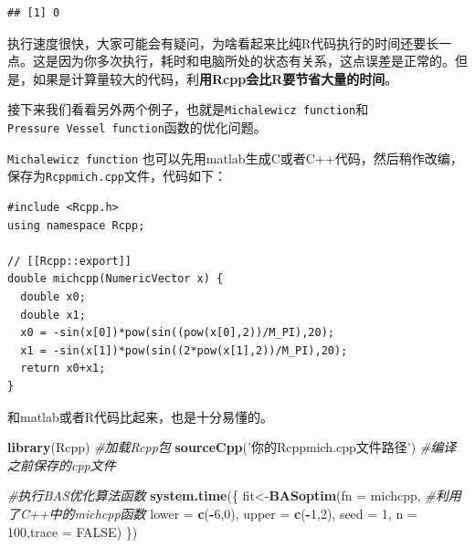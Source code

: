 \documentclass[]{ctexbook}
\newenvironment{Shaded}{\begin{snugshade}}{\end{snugshade}}
\newcommand{\KeywordTok}[1]{\textcolor[rgb]{0.13,0.29,0.53}{\textbf{#1}}}
\newcommand{\DataTypeTok}[1]{\textcolor[rgb]{0.13,0.29,0.53}{#1}}
\newcommand{\DecValTok}[1]{\textcolor[rgb]{0.00,0.00,0.81}{#1}}
\newcommand{\StringTok}[1]{\textcolor[rgb]{0.31,0.60,0.02}{#1}}
\newcommand{\CommentTok}[1]{\textcolor[rgb]{0.56,0.35,0.01}{\textit{#1}}}
\newcommand{\OtherTok}[1]{\textcolor[rgb]{0.56,0.35,0.01}{#1}}
\newcommand{\OperatorTok}[1]{\textcolor[rgb]{0.81,0.36,0.00}{\textbf{#1}}}
\newcommand{\NormalTok}[1]{#1}
\theoremstyle{definition}
\theoremstyle{definition}
\theoremstyle{definition}
\theoremstyle{remark}
\begin{document}
\begin{verbatim}
## [1] 0
\end{verbatim}

执行速度很快，大家可能会有疑问，为啥看起来比纯R代码执行的时间还要长一点。这是因为你多次执行，耗时和电脑所处的状态有关系，这点误差是正常的。但是，如果是计算量较大的代码，利\textbf{用Rcpp会比R要节省大量的时间}。

接下来我们看看另外两个例子，也就是\texttt{Michalewicz\ function}和\texttt{Pressure\ Vessel\ function}函数的优化问题。

\texttt{Michalewicz\ function}
也可以先用matlab生成C或者C++代码，然后稍作改编，保存为\texttt{Rcppmich.cpp}文件，代码如下：

\begin{verbatim}
#include <Rcpp.h>
using namespace Rcpp;

// [[Rcpp::export]]
double michcpp(NumericVector x) {
  double x0;
  double x1;
  x0 = -sin(x[0])*pow(sin((pow(x[0],2))/M_PI),20);
  x1 = -sin(x[1])*pow(sin((2*pow(x[1],2))/M_PI),20);
  return x0+x1;
}
\end{verbatim}

和matlab或者R代码比起来，也是十分易懂的。

\begin{Shaded}
\begin{Highlighting}[]
\KeywordTok{library}\NormalTok{(Rcpp) }\CommentTok{#加载Rcpp包}
\KeywordTok{sourceCpp}\NormalTok{(}\StringTok{'你的Rcppmich.cpp文件路径'}\NormalTok{) }\CommentTok{#编译之前保存的cpp文件}
\end{Highlighting}
\end{Shaded}

\begin{Shaded}
\begin{Highlighting}[]
\CommentTok{#执行BAS优化算法函数}
\KeywordTok{system.time}\NormalTok{(\{}
\NormalTok{  fit<-}\KeywordTok{BASoptim}\NormalTok{(}\DataTypeTok{fn =}\NormalTok{ michcpp, }\CommentTok{#利用了C++中的michcpp函数}
                \DataTypeTok{lower =} \KeywordTok{c}\NormalTok{(}\OperatorTok{-}\DecValTok{6}\NormalTok{,}\DecValTok{0}\NormalTok{), }\DataTypeTok{upper =} \KeywordTok{c}\NormalTok{(}\OperatorTok{-}\DecValTok{1}\NormalTok{,}\DecValTok{2}\NormalTok{),}
                \DataTypeTok{seed =} \DecValTok{1}\NormalTok{, }\DataTypeTok{n =} \DecValTok{100}\NormalTok{,}\DataTypeTok{trace =} \OtherTok{FALSE}\NormalTok{)}
\NormalTok{\})}
\end{Highlighting}
\end{Shaded}
\end{document}
